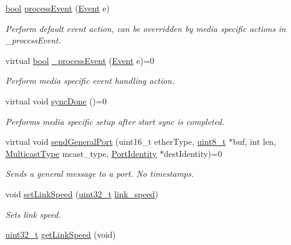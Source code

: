 \begin{DoxyCompactItemize}
\hyperlink{avb__gptp_8h_af6a258d8f3ee5206d682d799316314b1}{bool} \hyperlink{class_common_port_ac0536467e749cb4bb6b561f562857413}{process\+Event} (\hyperlink{class_event}{Event} e)
\begin{DoxyCompactList}\small\item\em Perform default event action, can be overridden by media specific actions in \+\_\+process\+Event. \end{DoxyCompactList}\item 
virtual \hyperlink{avb__gptp_8h_af6a258d8f3ee5206d682d799316314b1}{bool} \hyperlink{class_common_port_a8fdf705ad3f9d8794555fe1c611c19ec}{\+\_\+process\+Event} (\hyperlink{class_event}{Event} e)=0
\begin{DoxyCompactList}\small\item\em Perform media specific event handling action. \end{DoxyCompactList}\item 
virtual void \hyperlink{class_common_port_a01d4aad4d75c04bd00ad6ec3973e5c01}{sync\+Done} ()=0
\begin{DoxyCompactList}\small\item\em Performs media specific setup after start sync is completed. \end{DoxyCompactList}\item 
virtual void \hyperlink{class_common_port_a03f7724f30d3559245970e517b977a82}{send\+General\+Port} (uint16\+\_\+t ether\+Type, \hyperlink{stdint_8h_aba7bc1797add20fe3efdf37ced1182c5}{uint8\+\_\+t} $\ast$buf, int len, \hyperlink{avbts__message_8hpp_aee4ca524cb617678ed1bd2db2b56da42}{Multicast\+Type} mcast\+\_\+type, \hyperlink{class_port_identity}{Port\+Identity} $\ast$dest\+Identity)=0
\begin{DoxyCompactList}\small\item\em Sends a general message to a port. No timestamps. \end{DoxyCompactList}\item 
void \hyperlink{class_common_port_acecd1ce8f2db0d0160fa026ea30398e5}{set\+Link\+Speed} (\hyperlink{parse_8c_a6eb1e68cc391dd753bc8ce896dbb8315}{uint32\+\_\+t} \hyperlink{class_common_port_aae24fc4f200e75aa8215f797b2561dbf}{link\+\_\+speed})
\begin{DoxyCompactList}\small\item\em Sets link speed. \end{DoxyCompactList}\item 
\hyperlink{parse_8c_a6eb1e68cc391dd753bc8ce896dbb8315}{uint32\+\_\+t} \hyperlink{class_common_port_a78e0f246899dafdde4659c7ed0bb41d1}{get\+Link\+Speed} (void)

\end{DoxyCompactItemize}
